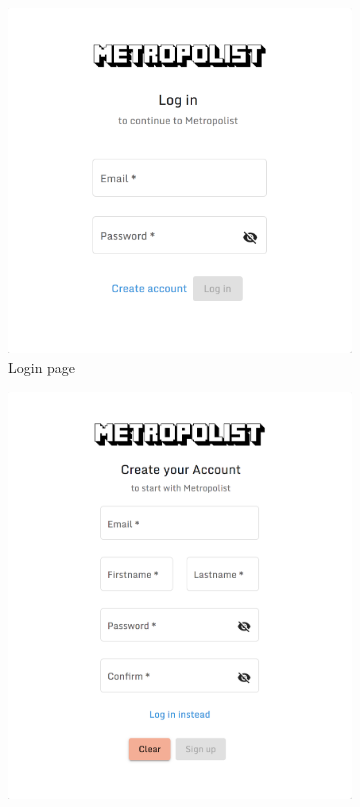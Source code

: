 \begin{enumerate}
  \begin{figure}
  \centering
    \begin{subfigure}{.5\textwidth}
      \centering
      \includegraphics[width=.99\textwidth]{section04/assets/GUI-login-small.png}
      \caption{Login page}
      \label{fig:GUI login}
    \end{subfigure}%
    \begin{subfigure}{.5\textwidth}
      \centering
      \includegraphics[width=.99\textwidth]{section04/assets/GUI-signup-small.png}

\end{subfigure}
\end{figure}
\end{enumerate}
